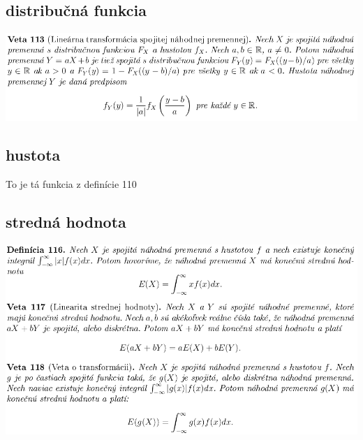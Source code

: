\subsection {distribučná funkcia}
\includegraphics[width=1\textwidth]{images/pravdepodobnost/dist_funk_spoj}\\
\subsection {hustota}
To je tá funkcia z definície 110\\
\subsection {stredná hodnota}
\includegraphics[width=1\textwidth]{images/pravdepodobnost/stred_hod_spoj}\\
